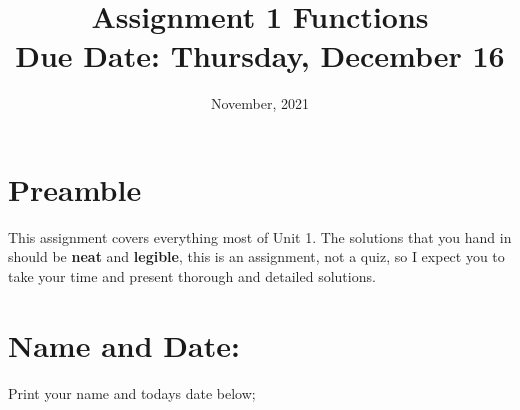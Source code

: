 \documentclass[12pt]{article} %
\title{\textbf{Assignment 1 Functions} \\ \textbf{Due Date: } Thursday, December 16}
\date{November, 2021}
\begin{document}
	\renewcommand*{\coursecode}{MATH 235} %
	\renewcommand*{\assgnnumber}{Assignment 1} %
	\renewcommand*{\submdate}{September 14, 2021} %
	\renewcommand*{\studentfname}{Abdullah} %
	\renewcommand*{\studentlname}{Zubair} %
    \renewcommand*{\proofname}{Proof:}

	\renewcommand\qedsymbol{$\blacksquare$}
	\setfigpath
	\fancyhfoffset[L,O]{0pt} %



\maketitle
	\section{Preamble}
  This assignment covers everything most of Unit 1. The solutions that you hand in should be \textbf{neat} and \textbf{legible},
  this is an assignment, not a quiz, so I expect you to take your time and present thorough and detailed solutions.
\section{Name and Date:}
	Print your name and todays date below;\\
\end{document}
